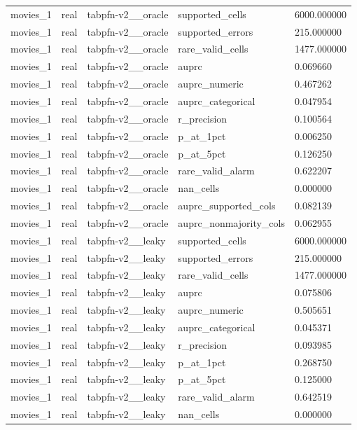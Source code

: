 \begin{tabular}{lllll}
movies\_1 & real & tabpfn-v2\_\_oracle & supported\_cells & 6000.000000 \\
movies\_1 & real & tabpfn-v2\_\_oracle & supported\_errors & 215.000000 \\
movies\_1 & real & tabpfn-v2\_\_oracle & rare\_valid\_cells & 1477.000000 \\
movies\_1 & real & tabpfn-v2\_\_oracle & auprc & 0.069660 \\
movies\_1 & real & tabpfn-v2\_\_oracle & auprc\_numeric & 0.467262 \\
movies\_1 & real & tabpfn-v2\_\_oracle & auprc\_categorical & 0.047954 \\
movies\_1 & real & tabpfn-v2\_\_oracle & r\_precision & 0.100564 \\
movies\_1 & real & tabpfn-v2\_\_oracle & p\_at\_1pct & 0.006250 \\
movies\_1 & real & tabpfn-v2\_\_oracle & p\_at\_5pct & 0.126250 \\
movies\_1 & real & tabpfn-v2\_\_oracle & rare\_valid\_alarm & 0.622207 \\
movies\_1 & real & tabpfn-v2\_\_oracle & nan\_cells & 0.000000 \\
movies\_1 & real & tabpfn-v2\_\_oracle & auprc\_supported\_cols & 0.082139 \\
movies\_1 & real & tabpfn-v2\_\_oracle & auprc\_nonmajority\_cols & 0.062955 \\
movies\_1 & real & tabpfn-v2\_\_leaky & supported\_cells & 6000.000000 \\
movies\_1 & real & tabpfn-v2\_\_leaky & supported\_errors & 215.000000 \\
movies\_1 & real & tabpfn-v2\_\_leaky & rare\_valid\_cells & 1477.000000 \\
movies\_1 & real & tabpfn-v2\_\_leaky & auprc & 0.075806 \\
movies\_1 & real & tabpfn-v2\_\_leaky & auprc\_numeric & 0.505651 \\
movies\_1 & real & tabpfn-v2\_\_leaky & auprc\_categorical & 0.045371 \\
movies\_1 & real & tabpfn-v2\_\_leaky & r\_precision & 0.093985 \\
movies\_1 & real & tabpfn-v2\_\_leaky & p\_at\_1pct & 0.268750 \\
movies\_1 & real & tabpfn-v2\_\_leaky & p\_at\_5pct & 0.125000 \\
movies\_1 & real & tabpfn-v2\_\_leaky & rare\_valid\_alarm & 0.642519 \\
movies\_1 & real & tabpfn-v2\_\_leaky & nan\_cells & 0.000000 \\

\end{tabular}
